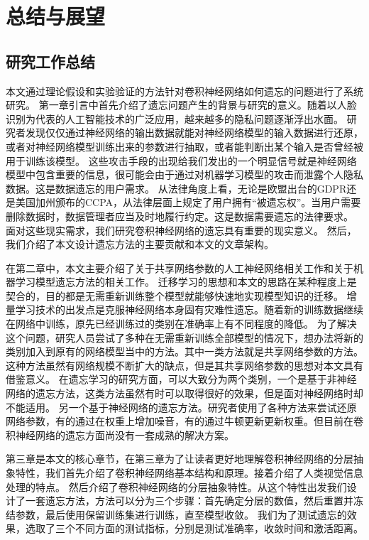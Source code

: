 
\chapter{总结与展望}

\section{研究工作总结}

本文通过理论假设和实验验证的方法针对卷积神经网络如何遗忘的问题进行了系统研究。
第一章引言中首先介绍了遗忘问题产生的背景与研究的意义。随着以人脸识别为代表的人工智能技术的广泛应用，越来越多的隐私问题逐渐浮出水面。
研究者发现仅仅通过神经网络的输出数据就能对神经网络模型的输入数据进行还原，或者对神经网络模型训练出来的参数进行抽取，或者能判断出某个输入是否曾经被用于训练该模型。
这些攻击手段的出现给我们发出的一个明显信号就是神经网络模型中包含重要的信息，很可能会由于通过对机器学习模型的攻击而泄露个人隐私数据。这是数据遗忘的用户需求。
从法律角度上看，无论是欧盟出台的GDPR还是美国加州颁布的CCPA，从法律层面上规定了用户拥有“被遗忘权”。当用户需要删除数据时，数据管理者应当及时地履行约定。这是数据需要遗忘的法律要求。
面对这些现实需求，我们研究卷积神经网络的遗忘具有重要的现实意义。
然后，我们介绍了本文设计遗忘方法的主要贡献和本文的文章架构。

在第二章中，本文主要介绍了关于共享网络参数的人工神经网络相关工作和关于机器学习模型遗忘方法的相关工作。
迁移学习的思想和本文的思路在某种程度上是契合的，目的都是无需重新训练整个模型就能够快速地实现模型知识的迁移。
增量学习技术的出发点是克服神经网络本身固有灾难性遗忘。随着新的训练数据继续在网络中训练，原先已经训练过的类别在准确率上有不同程度的降低。
为了解决这个问题，研究人员尝试了多种在无需重新训练全部模型的情况下，想办法将新的类别加入到原有的网络模型当中的方法。其中一类方法就是共享网络参数的方法。
这种方法虽然有网络规模不断扩大的缺点，但是其共享网络参数的思想对本文具有借鉴意义。
在遗忘学习的研究方面，可以大致分为两个类别，一个是基于非神经网络的遗忘方法，这类方法虽然有时可以取得很好的效果，但是面对神经网络时却不能适用。
另一个基于神经网络的遗忘方法。研究者使用了各种方法来尝试还原网络参数，有的通过在权重上增加噪音，有的通过牛顿更新更新权重。但目前在卷积神经网络的遗忘方面尚没有一套成熟的解决方案。

第三章是本文的核心章节，在第三章为了让读者更好地理解卷积神经网络的分层抽象特性，我们首先介绍了卷积神经网络基本结构和原理。接着介绍了人类视觉信息处理的特点。
然后介绍了卷积神经网络的分层抽象特性。从这个特性出发我们设计了一套遗忘方法，方法可以分为三个步骤：首先确定分层的数值，然后重置并冻结参数，最后使用保留训练集进行训练，直至模型收敛。
我们为了测试遗忘的效果，选取了三个不同方面的测试指标，分别是测试准确率，收敛时间和激活距离。

